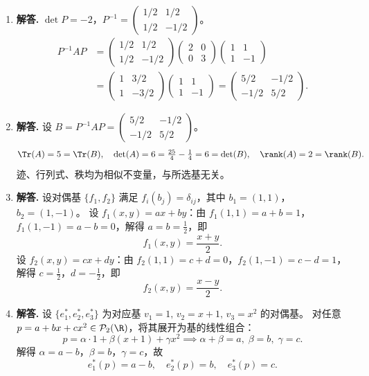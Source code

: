 \begin{enumerate}[label=\textbf{\arabic*.}, leftmargin=*, itemsep=1em]
\item \textbf{解答.}
$\det P=-2$，$P^{-1}=\begin{pmatrix}1/2&1/2\\1/2&-1/2\end{pmatrix}$。
\begin{align*}
  P^{-1}AP
  &=\begin{pmatrix}1/2&1/2\\1/2&-1/2\end{pmatrix}
    \begin{pmatrix}2&0\\0&3\end{pmatrix}
    \begin{pmatrix}1&1\\1&-1\end{pmatrix} \\
  &=\begin{pmatrix}1&3/2\\1&-3/2\end{pmatrix}
    \begin{pmatrix}1&1\\1&-1\end{pmatrix}
  =\begin{pmatrix}5/2&-1/2\\-1/2&5/2\end{pmatrix}.
\end{align*}

\item \textbf{解答.}
设 $B=P^{-1}AP=\begin{pmatrix}5/2&-1/2\\-1/2&5/2\end{pmatrix}$。
\[
  \Tr(A)=5=\Tr(B),\quad
  \det(A)=6=\tfrac{25}{4}-\tfrac{1}{4}=6=\det(B),\quad
  \rank(A)=2=\rank(B).
\]
迹、行列式、秩均为相似不变量，与所选基无关。

\item \textbf{解答.}
设对偶基 $\{f_1,f_2\}$ 满足 $f_i(b_j)=\delta_{ij}$，其中 $b_1=(1,1)$，$b_2=(1,-1)$。
设 $f_1(x,y)=ax+by$：由 $f_1(1,1)=a+b=1$，$f_1(1,-1)=a-b=0$，解得 $a=b=\tfrac{1}{2}$，即
\[
  f_1(x,y)=\frac{x+y}{2}.
\]
设 $f_2(x,y)=cx+dy$：由 $f_2(1,1)=c+d=0$，$f_2(1,-1)=c-d=1$，解得 $c=\tfrac{1}{2}$，$d=-\tfrac{1}{2}$，即
\[
  f_2(x,y)=\frac{x-y}{2}.
\]

\item \textbf{解答.}
设 $\{e_1^*,e_2^*,e_3^*\}$ 为对应基 $v_1=1,\,v_2=x+1,\,v_3=x^2$ 的对偶基。
对任意 $p=a+bx+cx^2\in\mathcal{P}_2(\R)$，将其展开为基的线性组合：
\[
  p=\alpha\cdot 1+\beta(x+1)+\gamma x^2
  \implies \alpha+\beta=a,\;\beta=b,\;\gamma=c.
\]
解得 $\alpha=a-b$，$\beta=b$，$\gamma=c$，故
\[
  e_1^*(p)=a-b,\quad e_2^*(p)=b,\quad e_3^*(p)=c.
\]


\end{enumerate}
